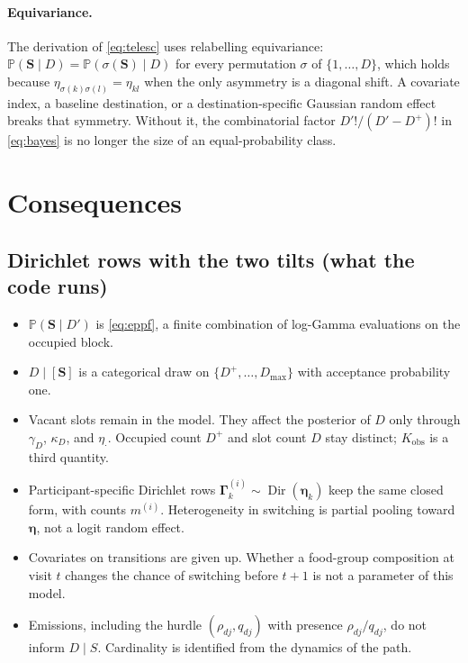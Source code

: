 \documentclass[11pt,a4paper]{article}
\DeclareMathOperator{\Dir}{Dir}
\newcommand{\bs}{\boldsymbol}
\newcommand{\Prb}{\mathbb{P}}
\newcommand{\bGamma}{\boldsymbol{\Gamma}}
\newcommand{\Dplus}{D^{+}}
\newcommand{\Dmax}{D_{\max}}
\newcommand{\gammaD}{\gamma_{D}}
\newcommand{\kapD}{\kappa_{D}}
\newcommand{\etadot}{\eta_{\boldsymbol{\cdot}}}
\theoremstyle{plain}
\theoremstyle{definition}
\theoremstyle{remark}
\begin{document}
\paragraph{Equivariance.}
The derivation of \eqref{eq:telesc} uses relabelling equivariance:
$\Prb(\bs S\mid D)=\Prb(\sigma(\bs S)\mid D)$ for every permutation
$\sigma$ of $\{1,\dots,D\}$, which holds because $\eta_{\sigma(k)\sigma(l)}=\eta_{kl}$
when the only asymmetry is a diagonal shift. A covariate index, a
baseline destination, or a destination-specific Gaussian random effect
breaks that symmetry. Without it, the combinatorial factor
$D'!/(D'-\Dplus)!$ in \eqref{eq:bayes} is no longer the size of an
equal-probability class.

\section{Consequences}

\subsection*{Dirichlet rows with the two tilts (what the code runs)}

\begin{itemize}
\item $\Prb(\bs S\mid D')$ is \eqref{eq:eppf}, a finite combination of
log-Gamma evaluations on the occupied block.
\item $D\mid[\bs S]$ is a categorical draw on $\{\Dplus,\dots,\Dmax\}$
with acceptance probability one.
\item Vacant slots remain in the model. They affect the posterior of $D$
only through $\gammaD$, $\kapD$, and $\etadot$. Occupied count $\Dplus$
and slot count $D$ stay distinct; $K_{\mathrm{obs}}$ is a third quantity.
\item Participant-specific Dirichlet rows
$\bGamma^{(i)}_k\sim\Dir(\bs\eta_k)$ keep the same closed form, with
counts $m^{(i)}$. Heterogeneity in switching is partial pooling toward
$\bs\eta$, not a logit random effect.
\item Covariates on transitions are given up. Whether a food-group
composition at visit $t$ changes the chance of switching before $t+1$ is
not a parameter of this model.
\item Emissions, including the hurdle $(\rho_{dj},q_{dj})$ with presence
$\rho_{dj}/q_{dj}$, do not inform $D\mid S$. Cardinality is identified
from the dynamics of the path.
\end{itemize}
\end{document}
